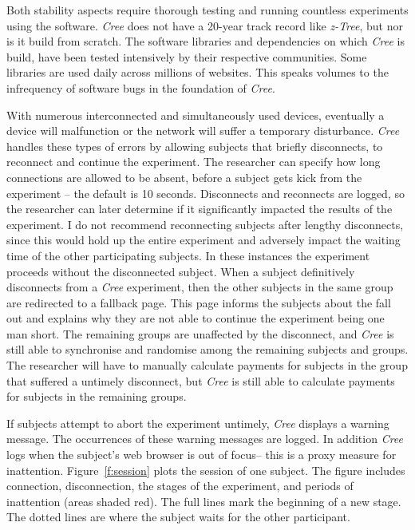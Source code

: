 \documentclass[preprint, 12pt]{elsarticle}
\newcommand{\Cree}{\emph{Cree}\xspace}
\begin{document}
Both stability aspects require thorough testing and running countless experiments using the software. \Cree does not have a 20-year track record like \emph{z-Tree}, but nor is it build from scratch. The software libraries and dependencies on which \Cree is build, have been tested intensively by their respective communities. Some libraries are used daily across millions of websites\footnotemark[6]. This speaks volumes to the infrequency of software bugs in the foundation of \Cree.


With numerous interconnected and simultaneously used devices, eventually a device will malfunction or the network will suffer a temporary disturbance. \Cree handles these types of errors by allowing subjects that briefly disconnects, to reconnect and continue the experiment. The researcher can specify how long connections are allowed to be absent, before a subject gets kick from the experiment -- the default is 10 seconds. Disconnects and reconnects are logged, so the researcher can later determine if it significantly impacted the results of the experiment. I do not recommend reconnecting subjects after lengthy disconnects, since this would hold up the entire experiment and adversely impact the waiting time of the other participating subjects. In these instances the experiment proceeds without the disconnected subject. When a subject definitively disconnects from a \Cree experiment, then the other subjects in the same group are redirected to a fallback page. This page informs the subjects about the fall out and explains why they are not able to continue the experiment being one man short. The remaining groups are unaffected by the disconnect, and \Cree is still able to  synchronise and randomise among the remaining subjects and groups. The researcher will have to manually calculate payments for subjects in the group that suffered a untimely disconnect, but \Cree is still able to calculate payments for subjects in the remaining groups.

If subjects attempt to abort the experiment untimely, \Cree displays a warning message. The occurrences of these warning messages are logged. In addition \Cree logs when the subject's web browser is out of focus\footnotemark[7] -- this is a proxy measure for inattention. Figure~\ref{f:session} plots the session of one subject. The figure includes connection, disconnection, the stages of the experiment, and periods of inattention (areas shaded red). The full lines mark the beginning of a new stage. The dotted lines are where the subject waits for the other participant.
\end{document}

